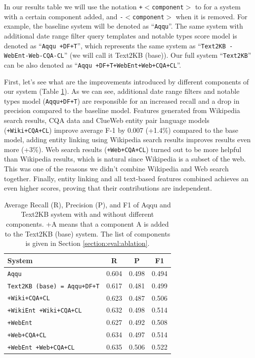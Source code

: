 In our results table we will use the notation \texttt{+$<$component$>$} to for a system with a certain component added, and \texttt{-$<$component$>$} when it is removed.
For example, the baseline system will be denoted as ``\texttt{Aqqu}''.
The same system with additional date range filter query templates and notable types score model is denoted as ``\texttt{Aqqu +DF+T}'', which represents the same system as ``\texttt{Text2KB -WebEnt-Web-CQA-CL}'' (we will call it Text2KB (base)).
Our full system ``\texttt{Text2KB}'' can be also denoted as ``\texttt{Aqqu +DF+T+WebEnt+Web+CQA+CL}''.

First, let's see what are the improvements introduced by different components of our system (Table \ref{table:ablation:entities_vs_features}).
As we can see, additional date range filters and notable types model (\texttt{Aqqu+DF+T}) are responsible for an increased recall and a drop in precision compared to the baseline model.
Features generated from Wikipedia search results, CQA data and ClueWeb entity pair language models (\texttt{+Wiki+CQA+CL}) improve average F-1 by 0.007 (+1.4\%) compared to the base model, adding entity linking using Wikipedia search results improves results even more (+3\%).
Web search results (\texttt{+Web+CQA+CL}) turned out to be more helpful than Wikipedia results, which is natural since Wikipedia is a subset of the web.
This was one of the reasons we didn't combine Wikipedia and Web search together.
Finally, entity linking and all text-based features combined achieves an even higher scores, proving that their contributions are independent.

\begin{table}[h]
\begin{tabular}{| p{4.5cm} | c | c | c | }
\hline
System & R & P & F1 \\
\hline
\texttt{Aqqu} & 0.604 & 0.498 & 0.494\\
\texttt{Text2KB (base) = Aqqu+DF+T} & 0.617 & 0.481 & 0.499 \\
\hline
\texttt{+Wiki+CQA+CL} & 0.623 & 0.487 & 0.506 \\
\texttt{+WikiEnt +Wiki+CQA+CL} & 0.632 & 0.498 & 0.514 \\
\hline
\texttt{+WebEnt} & 0.627 & 0.492 & 0.508 \\
\texttt{+Web+CQA+CL} & 0.634 & 0.497 & 0.514 \\
\texttt{+WebEnt +Web+CQA+CL} & 0.635 & 0.506 & 0.522 \\



\hline
\end{tabular}
\caption{Average Recall (R), Precision (P), and F1 of Aqqu and Text2KB system with and without different components. +A means that a component A is added to the Text2KB (base) system. The list of components is given in Section \ref{section:eval:ablation}.}
\label{table:ablation:entities_vs_features}
\end{table}

